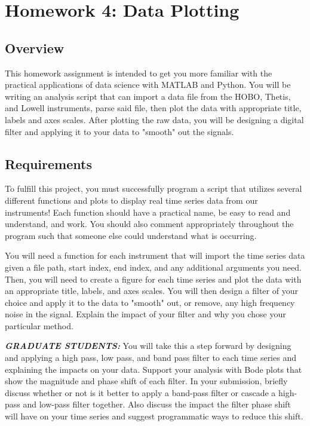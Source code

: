 \documentclass[
	letterpaper, %
	fontsize=10pt, %
	twoside=true, %
	numbers=noenddot, %
]{kaobook}
\begin{document}
\chapter*{Homework 4: Data Plotting}

\section*{Overview}
This homework assignment is intended to get you more familiar with the practical applications of data science with MATLAB and Python.
You will be writing an analysis script that can import a data file from the HOBO, Thetis, and Lowell instruments, parse said file, then plot the data with appropriate title, labels and axes scales. 
After plotting the raw data, you will be designing a digital filter and applying it to your data to "smooth" out the signals. 

\section*{Requirements}
To fulfill this project, you must successfully program a script that utilizes several different functions and plots to display real time series data from our instruments!
Each function should have a practical name, be easy to read and understand, and work.
You should also comment appropriately throughout the program such that someone else could understand what is occurring.

You will need a function for each instrument that will import the time series data given a file path, start index, end index, and any additional arguments you need.
Then, you will need to create a figure for each time series and plot the data with an appropriate title, labels, and axes scales.
You will then design a filter of your choice and apply it to the data to "smooth" out, or remove, any high frequency noise in the signal.
Explain the impact of your filter and why you chose your particular method.

\textbf{\emph{GRADUATE STUDENTS:}} You will take this a step forward by designing and applying a high pass, low pass, and band pass filter to each time series and explaining the impacts on your data.
Support your analysis with Bode plots that show the magnitude and phase shift of each filter.
In your submission, briefly discuss whether or not is it better to apply a band-pass filter or cascade a high-pass and low-pass filter together.
Also discuss the impact the filter phase shift will have on your time series and suggest programmatic ways to reduce this shift.
\end{document}
